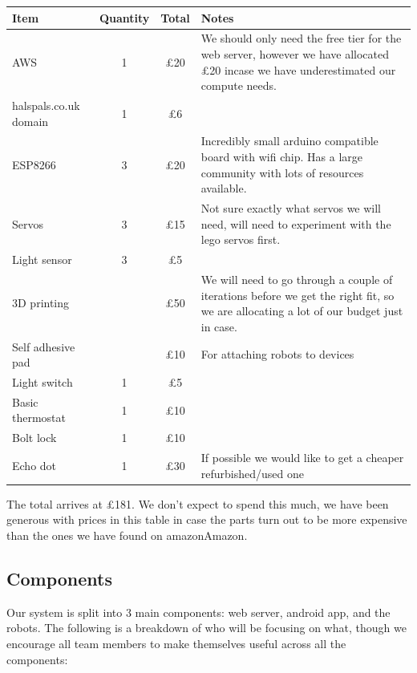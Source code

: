 \documentclass[onecolumn]{IEEEtran}
\begin{document}
\begin{center}
    \begin{tabularx}{\linewidth}{|l|c|c|L|}
        \hline
        \textbf{Item} & \textbf{Quantity} & \textbf{Total} & \textbf{Notes} \\
        \hline
        AWS & 1 & £20 & We should only need the free tier for the web server, however we have allocated £20 incase we have underestimated our compute needs. \\
        \hline
        halspals.co.uk domain & 1 & £6 &  \\
        \hline
        ESP8266 & 3 & £20 & Incredibly small arduino compatible board with wifi chip. Has a large community with lots of resources available. \\
        \hline
        Servos & 3 & £15 & Not sure exactly what servos we will need, will need to experiment with the lego servos first. \\
        \hline
        Light sensor & 3 & £5 &  \\
        \hline
        3D printing &  & £50 & We will need to go through a couple of iterations before we get the right fit, so we are allocating a lot of our budget just in case. \\
        \hline
        Self adhesive pad & & £10 & For attaching robots to devices \\
        \hline
        Light switch & 1 & £5 & \\
        \hline
        Basic thermostat & 1 & £10 & \\
        \hline
        Bolt lock & 1 & £10 & \\
        \hline
        Echo dot & 1 & £30 & If possible we would like to get a cheaper refurbished/used one \\
        \hline
    \end{tabularx}    
\end{center}

The total arrives at £181. We don't expect to spend this much, we have been generous with prices in this table in case the parts turn out to be more expensive than the ones we have found on amazonAmazon.

\subsection{Components}

Our system is split into 3 main components: web server, android app, and the robots. The following is a breakdown of who will be focusing on what, though we encourage all team members to make themselves useful across all the components:
\end{document}

